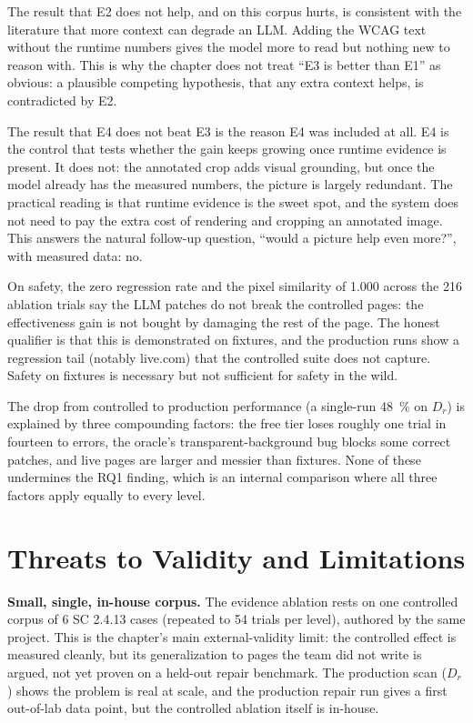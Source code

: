 \documentclass[11pt]{article}
\newcommand{\Dr}{\ensuremath{D_r}}
\begin{document}
The result that E2 does not help, and on this corpus hurts, is consistent with the
literature that more context can degrade an LLM. Adding the WCAG text without the
runtime numbers gives the model more to read but nothing new to reason with. This is
why the chapter does not treat ``E3 is better than E1'' as obvious: a plausible
competing hypothesis, that any extra context helps, is contradicted by E2.

The result that E4 does not beat E3 is the reason E4 was included at all. E4 is the
control that tests whether the gain keeps growing once runtime evidence is present. It
does not: the annotated crop adds visual grounding, but once the model already has the
measured numbers, the picture is largely redundant. The practical reading is that
runtime evidence is the sweet spot, and the system does not need to pay the extra cost
of rendering and cropping an annotated image. This answers the natural follow-up
question, ``would a picture help even more?'', with measured data: no.

On safety, the zero regression rate and the pixel similarity of 1.000 across the 216
ablation trials say the LLM patches do not break the controlled pages: the
effectiveness gain is not bought by damaging the rest of the page. The honest
qualifier is that this is demonstrated on fixtures, and the production runs show a
regression tail (notably live.com) that the controlled suite does not capture. Safety
on fixtures is necessary but not sufficient for safety in the wild.

The drop from controlled to production performance (a single-run \SI{48}{\percent} on
\Dr) is explained by three compounding factors: the free tier loses roughly one trial
in fourteen to errors, the oracle's transparent-background bug blocks some correct
patches, and live pages are larger and messier than fixtures. None of these undermines
the RQ1 finding, which is an internal comparison where all three factors apply equally
to every level.

\section{Threats to Validity and Limitations}
\label{sec:threats}

\textbf{Small, single, in-house corpus.} The evidence ablation rests on one
controlled corpus of 6 SC 2.4.13 cases (repeated to 54 trials per level), authored by
the same project. This is the chapter's main external-validity limit: the controlled
effect is measured cleanly, but its generalization to pages the team did not write is
argued, not yet proven on a held-out repair benchmark. The production scan (\Dr)
shows the problem is real at scale, and the production repair run gives a first
out-of-lab data point, but the controlled ablation itself is in-house.
\end{document}
